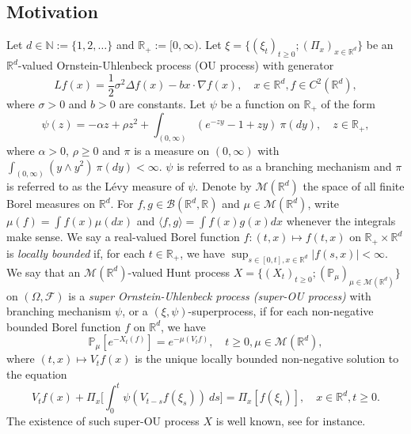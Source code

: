 \documentclass[EJP]{ejpecp} %
\begin{document}
\subsection{Motivation}
\label{subsec:M}
	Let $d \in \mathbb N:= \{1,2,\dots\}$ and $\mathbb R_+:= [0,\infty)$.
	Let $\xi=\{(\xi_t)_{t\geq 0}; (\Pi_x)_{x\in \mathbb R^d}\}$ be an $\mathbb R^d$-valued Ornstein-Uhlenbeck process (OU process) with generator
\[
	Lf(x)
	= \frac{1}{2}\sigma^2\Delta f(x)-b x \cdot \nabla f(x),
	\quad  x\in \mathbb R^d, f \in C^2(\mathbb R^d),
\]
	where $\sigma > 0$ and $b > 0$ are constants.
	Let $\psi$ be a function on $\mathbb R_+$ of the form
\begin{equation}
\label{eq: honogeneou branching mechanism}
	\psi(z)
	=- \alpha z + \rho z^2 + \int_{(0,\infty)} (e^{-zy} - 1 + zy)~\pi(dy),
	\quad  z \in \mathbb R_+,
\end{equation}
	where $\alpha > 0 $, $\rho \geq0$ and $\pi$ is a measure on $(0,\infty)$ with $\int_{(0,\infty)}(y\wedge y^2)~\pi(dy)< \infty$.
	$\psi$ is referred to as a branching mechanism and $\pi$ is referred to as the L\'evy measure of $\psi$.
	Denote by $\mathcal M(\mathbb R^d)$ the space of all finite Borel measures on $\mathbb R^d$.
	For $f,g\in \mathcal B(\mathbb R^d, \mathbb R)$ and $\mu \in \mathcal M(\mathbb R^d)$, write $\mu(f)= \int f(x)\mu(dx)$ and $\langle f, g\rangle = \int f(x)g(x) dx$ whenever the integrals make sense.
	We say a real-valued Borel function $f:(t,x)\mapsto f(t,x)$ on $\mathbb R_+\times \mathbb R^d$ is \emph{locally bounded} if, for each $t\in \mathbb R_+$, we have $ \sup_{s\in [0,t],x\in \mathbb R^d} |f(s,x)|<\infty.$
	We say that an $\mathcal M(\mathbb R^d)$-valued Hunt process $X = \{(X_t)_{t\geq 0}; (\mathbb{P}_{\mu})_{\mu \in \mathcal M(\mathbb R^d)}\}$ on  $(\Omega, \mathscr{F})$ is a \emph{super Ornstein-Uhlenbeck process (super-OU process)} with branching mechanism $\psi$, or a $(\xi, \psi)$-superprocess, if for each non-negative bounded Borel function $f$ on $\mathbb R^d$, we have
\begin{equation}
\label{eq: def of V_t}
	\mathbb{P}_{\mu}[e^{-X_t(f)}]
	= e^{-\mu(V_tf)},
	\quad t\geq 0, \mu \in \mathcal M(\mathbb R^d),
\end{equation}
	where $(t,x) \mapsto V_tf(x)$ is the unique locally bounded non-negative solution to the equation
\[
	V_tf(x) + \Pi_x \Big[ \int_0^t\psi (V_{t-s}f(\xi_s) )~ds\Big]
	= \Pi_x [f(\xi_t)],
	\quad x\in \mathbb R^d, t\geq 0.
\]	
	The existence of such super-OU process $X$ is well known, see \cite{Dynkin1993Superprocesses} for instance.
\end{document}
